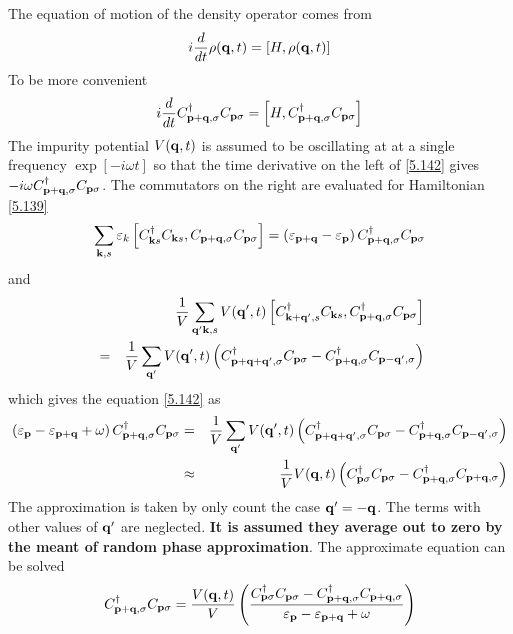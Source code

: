 The equation of motion of the density operator comes from
\begin{equation}
    i \frac{d}{dt} \rho(\mathbf{q},t) = \left[ H, \rho(\mathbf{q},t) \right]  \label{5.142}
\end{equation}
To be more convenient
\begin{equation}
    i \frac{d}{dt } C^\dagger_{\mathbf{p}+\mathbf{q},\sigma} C_{\mathbf{p}\sigma} = \left[ H, C^\dagger_{\mathbf{p}+\mathbf{q},\sigma} C_{\mathbf{p}\sigma} \right]   \label{5.143}
\end{equation}
The impurity potential $V(\mathbf{q},t)$ is assumed to be oscillating at at a single frequency $\exp[-i\omega t]$ so that the time derivative on the left of \eqref{5.142} gives $-i\omega C^\dagger_{\mathbf{p}+\mathbf{q},\sigma} C_{\mathbf{p}\sigma}$.
The commutators on the right are evaluated for Hamiltonian \eqref{5.139}
\begin{equation}
    \sum_{\mathbf{k},s} \varepsilon_k \left[ C^\dagger_{\mathbf{k} s}C_{\mathbf{k} s},C_{\mathbf{p}+\mathbf{q},\sigma}C_{\mathbf{p}\sigma}\right] = \left(\varepsilon_{\mathbf{p}+\mathbf{q}} - \varepsilon_{\mathbf{p}} \right)C^\dagger_{\mathbf{p}+\mathbf{q},\sigma}C_{\mathbf{p}\sigma}    \label{5.144}
\end{equation}
and
\begin{eqnarray}
    &~& \frac{1}{V} \sum_{\mathbf{q}' \mathbf{k},s} V(\mathbf{q}',t) \left[ C^\dagger_{\mathbf{k}+\mathbf{q}',s} C_{\mathbf{k} s},C^\dagger_{\mathbf{p}+\mathbf{q},\sigma} C_{\mathbf{p} \sigma} \right] \nonumber \\
    &=& \frac{1}{V} \sum_{\mathbf{q}'} V(\mathbf{q}',t) \left(C^\dagger_{\mathbf{p}+\mathbf{q}+\mathbf{q}',\sigma}C_{\mathbf{p}\sigma} - C^\dagger_{\mathbf{p}+\mathbf{q},\sigma}C_{\mathbf{p}-\mathbf{q}',\sigma} \right)    \label{5.145}
\end{eqnarray}
which gives the equation \eqref{5.142} as
\begin{eqnarray}
    \left( \varepsilon_{\mathbf{p}} - \varepsilon_{\mathbf{p}+\mathbf{q}} + \omega \right) C^\dagger_{\mathbf{p}+\mathbf{q},\sigma} C_{\mathbf{p}\sigma} &=& \frac{1}{V} \sum_{\mathbf{q}'} V(\mathbf{q}',t) \left( C^\dagger_{\mathbf{p}+\mathbf{q}+ \mathbf{q}',\sigma} C_{\mathbf{p}\sigma}-C^\dagger_{\mathbf{p}+\mathbf{q},\sigma} C_{\mathbf{p}-\mathbf{q}',\sigma}\right) \nonumber \\
    &\approx& \frac{1}{V} V(\mathbf{q},t) \left( C^\dagger_{\mathbf{p}\sigma} C_{\mathbf{p}\sigma}-C^\dagger_{\mathbf{p}+\mathbf{q},\sigma} C_{\mathbf{p}+\mathbf{q},\sigma}\right)  \label{5.146}
\end{eqnarray}
The approximation is taken by only count the case $\mathbf{q}' = -\mathbf{q}$.
The terms with other values of $\mathbf{q}'$ are neglected.
\textbf{It is assumed they average out to zero by the meant of random phase approximation}.
The approximate equation can be solved
\begin{equation}
    C_{\mathbf{p}+\mathbf{q},\sigma}^\dagger C_{\mathbf{p}\sigma} = \frac{V(\mathbf{q},t)}{V} \left( \frac{C^\dagger_{\mathbf{p}\sigma}C_{\mathbf{p}\sigma} - C^\dagger_{\mathbf{p}+\mathbf{q},\sigma} C_{\mathbf{p}+\mathbf{q},\sigma}}{\varepsilon_{\mathbf{p}} -\varepsilon_{\mathbf{p}+\mathbf{q}} +\omega}   \right)    \label{5.147}
\end{equation}
